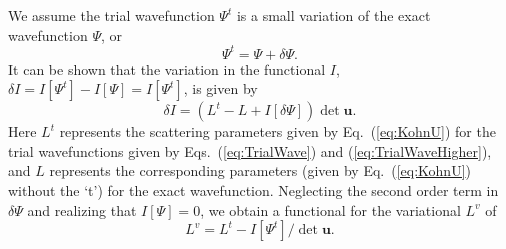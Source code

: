\documentclass[preprint,showpacs,showkeys,preprintnumbers,amsmath,amssymb,longbibliography,pra,aps]{revtex4-1}
\begin{document}
We assume the trial wavefunction $\Psi^t$ is a small variation of the exact wavefunction
$\Psi$, or
\begin{equation}
\Psi^t = \Psi + \delta \Psi.
\label{eq:PsiTrialRelation}
\end{equation}
It can be shown that the variation in the functional $I$,
$\delta I = I[\Psi^t] - I[\Psi] = I[\Psi^t]$,
is given by
\begin{equation}
\delta I = (L^t - L + I[\delta \Psi]) \det \textbf{u}.
\label{eq:IlPsiVariation}
\end{equation}
Here $L^t$ represents the scattering parameters given by Eq.~(\ref{eq:KohnU})
for the trial wavefunctions given by Eqs.~(\ref{eq:TrialWave}) and
(\ref{eq:TrialWaveHigher}), and $L$ represents the corresponding parameters
(given by Eq.~(\ref{eq:KohnU}) without the `t') for the exact wavefunction.
Neglecting the second order term in $\delta \Psi$ and realizing that
$I[\Psi] = 0$, we obtain a functional for the variational $L^v$ of
\begin{equation}
L^v = L^t - I[\Psi^t] / \det \textbf{u}.
\label{eq:ComplexKohnVariation}
\end{equation}
\end{document}
